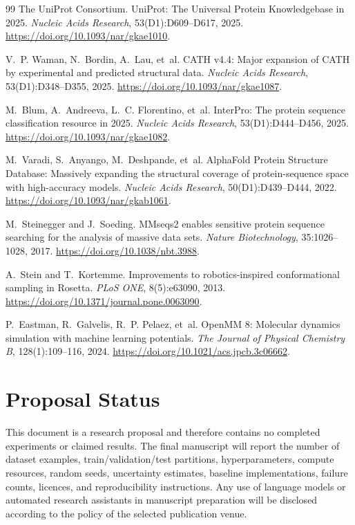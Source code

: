 \documentclass[10pt,a4paper]{article}
\begin{document}
\begin{thebibliography}{99}
The UniProt Consortium.
\newblock UniProt: The Universal Protein Knowledgebase in 2025.
\newblock \emph{Nucleic Acids Research}, 53(D1):D609--D617, 2025.
\newblock \url{https://doi.org/10.1093/nar/gkae1010}.

V.~P. Waman, N.~Bordin, A.~Lau, et~al.
\newblock CATH v4.4: Major expansion of CATH by experimental and predicted structural data.
\newblock \emph{Nucleic Acids Research}, 53(D1):D348--D355, 2025.
\newblock \url{https://doi.org/10.1093/nar/gkae1087}.

M.~Blum, A.~Andreeva, L.~C. Florentino, et~al.
\newblock InterPro: The protein sequence classification resource in 2025.
\newblock \emph{Nucleic Acids Research}, 53(D1):D444--D456, 2025.
\newblock \url{https://doi.org/10.1093/nar/gkae1082}.

M.~Varadi, S.~Anyango, M.~Deshpande, et~al.
\newblock AlphaFold Protein Structure Database: Massively expanding the structural coverage of protein-sequence space with high-accuracy models.
\newblock \emph{Nucleic Acids Research}, 50(D1):D439--D444, 2022.
\newblock \url{https://doi.org/10.1093/nar/gkab1061}.

M.~Steinegger and J.~Soeding.
\newblock MMseqs2 enables sensitive protein sequence searching for the analysis of massive data sets.
\newblock \emph{Nature Biotechnology}, 35:1026--1028, 2017.
\newblock \url{https://doi.org/10.1038/nbt.3988}.

A.~Stein and T.~Kortemme.
\newblock Improvements to robotics-inspired conformational sampling in Rosetta.
\newblock \emph{PLoS ONE}, 8(5):e63090, 2013.
\newblock \url{https://doi.org/10.1371/journal.pone.0063090}.

P.~Eastman, R.~Galvelis, R.~P. Pelaez, et~al.
\newblock OpenMM 8: Molecular dynamics simulation with machine learning potentials.
\newblock \emph{The Journal of Physical Chemistry B}, 128(1):109--116, 2024.
\newblock \url{https://doi.org/10.1021/acs.jpcb.3c06662}.

\end{thebibliography}

\section*{Proposal Status}

This document is a research proposal and therefore contains no completed experiments or claimed results. The final manuscript will report the number of dataset examples, train/validation/test partitions, hyperparameters, compute resources, random seeds, uncertainty estimates, baseline implementations, failure counts, licences, and reproducibility instructions. Any use of language models or automated research assistants in manuscript preparation will be disclosed according to the policy of the selected publication venue.
\end{document}
